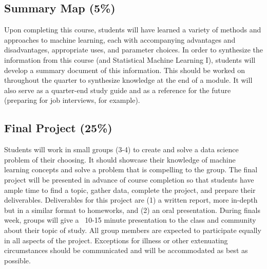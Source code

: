 \documentclass[16pt]{article}
\begin{document}

	
	\subsection*{Summary Map (5\%)}
	Upon completing this course, students will have learned a variety of methods and approaches to machine learning, each with accompanying advantages and disadvantages, appropriate uses, and parameter choices. In order to synthesize the information from this course (and Statistical Machine Learning I), students will develop a summary document of this information. This should be worked on throughout the quarter to synthesize knowledge at the end of a module. It will also serve as a quarter-end study guide and as a reference for the future (preparing for job interviews, for example). 
	
	\subsection*{Final Project (25\%)}
	Students will work in small groups (3-4) to create and solve a data science problem of their choosing. It should showcase their knowledge of machine learning concepts and solve a problem that is compelling to the group. The final project will be presented in advance of course completion so that students have ample time to find a topic, gather data, complete the project, and prepare their deliverables. Deliverables for this project are (1) a written report, more in-depth but in a similar format to homeworks, and (2) an oral presentation. During finals week, groups will give a ~10-15 minute presentation to the class and community about their topic of study. All group members are expected to participate equally in all aspects of the project. Exceptions for illness or other extenuating circumstances should be communicated and will be accommodated as best as possible.
	
\end{document}
